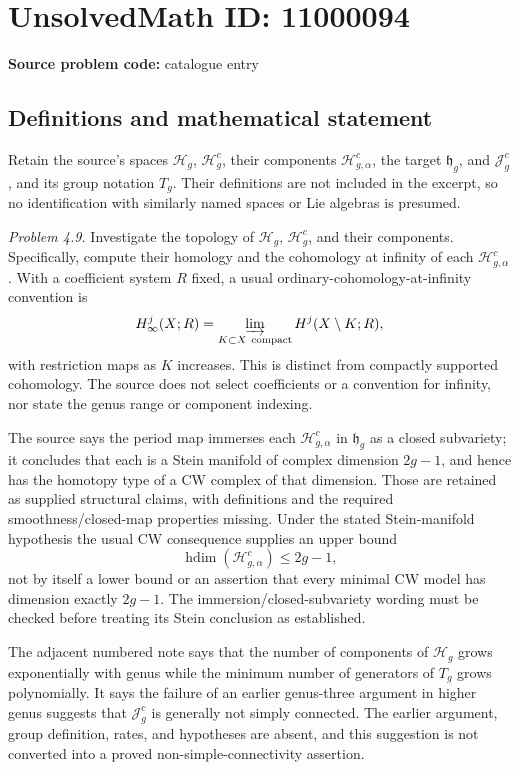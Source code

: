 \documentclass[11pt]{article}
\begin{document}
\section*{UnsolvedMath ID: 11000094}
\textbf{Source problem code:} catalogue entry
\subsection{Definitions and mathematical statement}
Retain the source's spaces \(\mathcal H_g\), \(\mathcal H_g^c\), their components \(\mathcal H_{g,\alpha}^c\), the target \(\mathfrak h_g\), and \(\mathcal J_g^c\), and its group notation \(T_g\). Their definitions are not included in the excerpt, so no identification with similarly named spaces or Lie algebras is presumed.

\emph{Problem 4.9.} Investigate the topology of \(\mathcal H_g\), \(\mathcal H_g^c\), and their components. Specifically, compute their homology and the cohomology at infinity of each \(\mathcal H_{g,\alpha}^c\). With a coefficient system \(R\) fixed, a usual ordinary-cohomology-at-infinity convention is
\[
 H^j_\infty(X;R)=\varinjlim_{K\subset X\ \mathrm{compact}}H^j(X\setminus K;R),
\]
with restriction maps as \(K\) increases. This is distinct from compactly supported cohomology. The source does not select coefficients or a convention for infinity, nor state the genus range or component indexing.

The source says the period map immerses each \(\mathcal H_{g,\alpha}^c\) in \(\mathfrak h_g\) as a closed subvariety; it concludes that each is a Stein manifold of complex dimension \(2g-1\), and hence has the homotopy type of a CW complex of that dimension. Those are retained as supplied structural claims, with definitions and the required smoothness/closed-map properties missing. Under the stated Stein-manifold hypothesis the usual CW consequence supplies an upper bound
\[
 \operatorname{hdim}(\mathcal H_{g,\alpha}^c)\leq2g-1,
\]
not by itself a lower bound or an assertion that every minimal CW model has dimension exactly \(2g-1\). The immersion/closed-subvariety wording must be checked before treating its Stein conclusion as established.

The adjacent numbered note says that the number of components of \(\mathcal H_g\) grows exponentially with genus while the minimum number of generators of \(T_g\) grows polynomially. It says the failure of an earlier genus-three argument in higher genus suggests that \(\mathcal J_g^c\) is generally not simply connected. The earlier argument, group definition, rates, and hypotheses are absent, and this suggestion is not converted into a proved non-simple-connectivity assertion.
\end{document}
